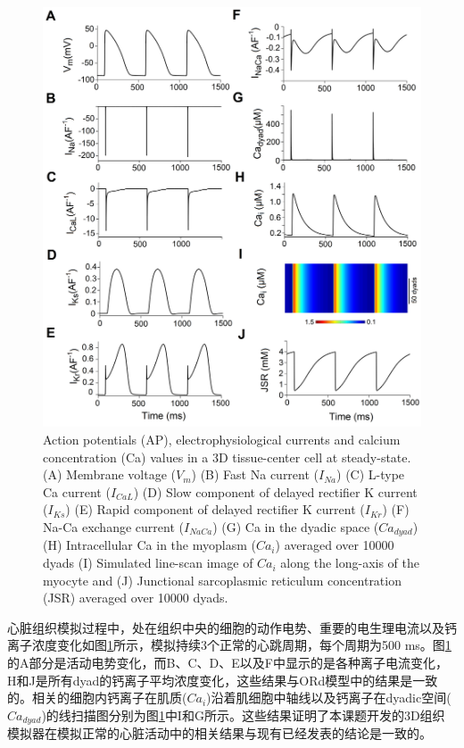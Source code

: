 \begin{figure}
 \includegraphics[width=\linewidth]{figs/cell_variables.png}
 \caption{Action potentials (AP), electrophysiological currents and calcium concentration (Ca) values in a 3D tissue-center cell at steady-state. (A) Membrane voltage ($V_m$) (B) Fast Na current ($I_{Na}$) (C) L-type Ca current ($I_{CaL}$) (D) Slow component of delayed rectifier K current ($I_{Ks}$) (E) Rapid component of delayed rectifier K current ($I_{Kr}$) (F) Na-Ca exchange current ($I_{NaCa}$) (G) Ca in the dyadic space ($Ca_{dyad}$) (H) Intracellular Ca in the myoplasm ($Ca_i$) averaged over 10000 dyads (I) Simulated line-scan image of $Ca_i$ along the long-axis of the myocyte and (J) Junctional sarcoplasmic reticulum concentration (JSR) averaged over 10000 dyads.}
 \label{fig:calcium}
\end{figure}

心脏组织模拟过程中，处在组织中央的细胞的动作电势、重要的电生理电流以及钙离子浓度变化如图\ref{fig:calcium}所示，模拟持续3个正常的心跳周期，每个周期为500 ms。图\ref{fig:calcium}的A部分是活动电势变化，而B、C、D、E以及F中显示的是各种离子电流变化，H和J是所有dyad的钙离子平均浓度变化，这些结果与ORd模型中的结果是一致的。相关的细胞内钙离子在肌质($Ca_i$)沿着肌细胞中轴线以及钙离子在dyadic空间($Ca_{dyad}$)的线扫描图分别为图\ref{fig:calcium}中I和G所示。这些结果证明了本课题开发的3D组织模拟器在模拟正常的心脏活动中的相关结果与现有已经发表的结论是一致的。

